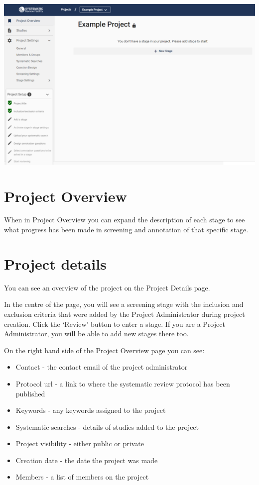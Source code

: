 \documentclass[
]{book}
\providecommand{\tightlist}{%
  \setlength{\itemsep}{0pt}\setlength{\parskip}{0pt}}
\begin{document}
\includegraphics[width=1\textwidth,height=1\textheight]{figs/Fig_Project_Nav.png}

\hypertarget{project-overview}{%
\section{Project Overview}\label{project-overview}}

When in Project Overview you can expand the description of each stage to see what progress has been made in screening and annotation of that specific stage.

\hypertarget{project-details}{%
\section{Project details}\label{project-details}}

You can see an overview of the project on the Project Details page.

In the centre of the page, you will see a screening stage with the inclusion and exclusion criteria that were added by the Project Administrator during project creation. Click the `Review' button to enter a stage. If you are a Project Administrator, you will be able to add new stages there too.

On the right hand side of the Project Overview page you can see:

\begin{itemize}
\tightlist
\item
  Contact - the contact email of the project administrator
\item
  Protocol url - a link to where the systematic review protocol has been published
\item
  Keywords - any keywords assigned to the project
\item
  Systematic searches - details of studies added to the project
\item
  Project visibility - either public or private
\item
  Creation date - the date the project was made
\item
  Members - a list of members on the project
\end{itemize}
\end{document}
